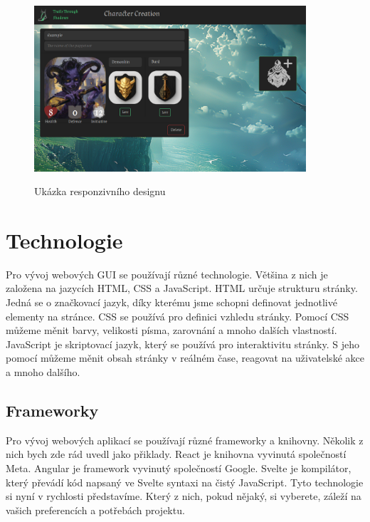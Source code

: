 \begin{figure}[H]
\begin{minipage}{0.3\textwidth}
    \label{fig:example5}
  \end{minipage}
  \begin{minipage}{0.7\textwidth}
    \centering
    \includegraphics[width=0.9\textwidth]{resources/figures/example6.png}
    \label{fig:example6}
  \end{minipage}
  \caption{Ukázka responzivního designu}
\end{figure}

\section{Technologie}
\label{sec:technologies}

Pro vývoj webových GUI se používají různé technologie. Většina z nich je založena na jazycích HTML, CSS a JavaScript. HTML určuje strukturu stránky. Jedná se o značkovací jazyk, díky kterému jsme schopni definovat jednotlivé elementy na stránce. CSS se používá pro definici vzhledu stránky. Pomocí CSS můžeme měnit barvy, velikosti písma, zarovnání a mnoho dalších vlastností. JavaScript je skriptovací jazyk, který se používá pro interaktivitu stránky. S jeho pomocí můžeme měnit obsah stránky v reálném čase, reagovat na uživatelské akce a mnoho dalšího.

\subsection{Frameworky}
\label{subsec:frameworks}

Pro vývoj webových aplikací se používají různé frameworky a knihovny. Několik z nich bych zde rád uvedl jako přiklady. React je knihovna vyvinutá společností Meta. Angular je framework vyvinutý společností Google. Svelte je kompilátor, který převádí kód napsaný ve Svelte syntaxi na čistý JavaScript. Tyto technologie si nyní v rychlosti představíme. Který z nich, pokud nějaký, si vyberete, záleží na vašich preferencích a potřebách projektu.

